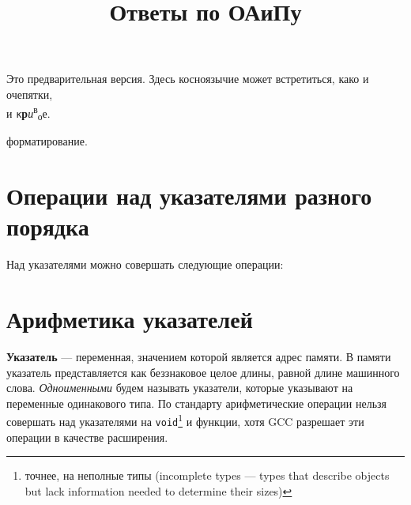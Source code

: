 \documentclass[14pt, a4paper]{extarticle}
\begin{document}
\title{Ответы по ОАиПу}
\maketitle
\vspace{6cm}
\begin{center}
  Это предварительная версия. Здесь косноязычие может встретиться, како и очепятки,
  \\
  \hspace*{12cm} и \verb|к|\textbf{р}\textit{и}\textsuperscript{в}\textsubscript{о}е.
\end{center}
форматирование.

\newcommand{\itembf}[1]{\item \textbf{#1}}
\newtheorem*{defin}{Определение} %
\newtheorem*{theorem}{Теорема} %

\newpage
\tableofcontents
\newpage

\setcounter{section}{36}

\section{Операции над указателями разного порядка}

Над указателями можно совершать следующие операции:

\section{Арифметика указателей}
\label{sec:ptr_arithm}
\textbf{Указатель} --- переменная, значением которой является адрес памяти.
В памяти указатель представляется как беззнаковое целое длины, равной длине
машинного слова.
\textit{Одноименными} будем называть указатели, которые указывают на переменные
одинакового типа. По стандарту арифметические операции нельзя совершать над 
указателями на \verb|void|\footnote{точнее, на неполные типы (incomplete types ---
types that describe objects but lack information needed to determine their sizes)}
и функции, хотя GCC разрешает эти операции в качестве расширения.
\end{document}
